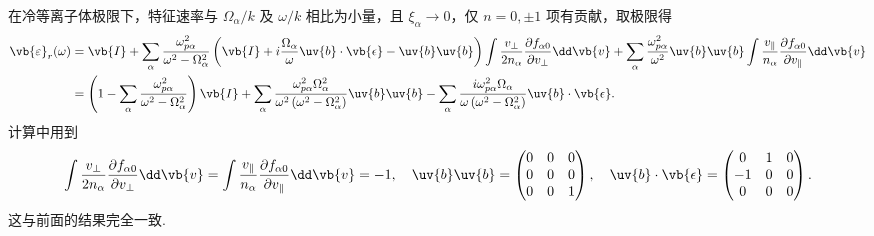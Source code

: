 在冷等离子体极限下，特征速率与 \(\Omega_\alpha/k\) 及 \(\omega/k\) 相比为小量，且 \(\xi_\alpha \to 0\)，仅 \(n = 0,\pm1\) 项有贡献，取极限得
\begin{align*}
	\vb{\varepsilon}_r(\omega) &= \vb{I} + \sum_\alpha\frac{\omega_{p\alpha}^2}{\omega^2 - \Omega_\alpha^2}\left( \vb{I} + i\frac{\Omega_\alpha}{\omega}\uv{b}\cdot\vb{\epsilon} - \uv{b}\uv{b} \right)
	\int\frac{v_\perp}{2n_\alpha}\frac{\partial f_{\alpha0}}{\partial v_\perp}\dd \vb{v} + \sum_\alpha\frac{\omega_{p\alpha}^2}{\omega^2}\uv{b}\uv{b}\int\frac{v_{\parallel}}{n_\alpha}\frac{\partial f_{\alpha0}}{\partial v_{\parallel}}\dd \vb{v}\\
	&= \left(1 - \sum_\alpha\frac{\omega_{p\alpha}^2}{\omega^2 - \Omega_\alpha^2}\right)\vb{I} + \sum_\alpha\frac{\omega_{p\alpha}^2\Omega_\alpha^2}{\omega^2\left(\omega^2 - \Omega_\alpha^2\right)}\uv{b}\uv{b} - \sum_\alpha\frac{i\omega_{p\alpha}^2\Omega_\alpha}{\omega\left(\omega^2 - \Omega_\alpha^2\right)}\uv{b}\cdot\vb{\epsilon}.
\end{align*}
计算中用到
\begin{align*}
	\int\frac{v_\perp}{2n_\alpha}\frac{\partial f_{\alpha0}}{\partial v_\perp}\dd \vb{v} = \int\frac{v_{\parallel}}{n_\alpha}\frac{\partial f_{\alpha0}}{\partial v_{\parallel}}\dd \vb{v} = -1,
	\quad
	\uv{b}\uv{b} = \begin{pmatrix}0&0&0\\0&0&0\\0&0&1\end{pmatrix},
	\quad
	\uv{b}\cdot\vb{\epsilon} = \begin{pmatrix}0&1&0\\-1&0&0\\0&0&0\end{pmatrix}.
\end{align*}
这与前面的结果完全一致.

